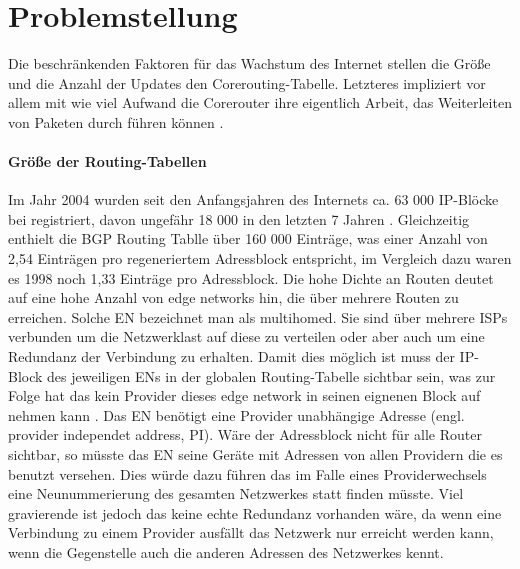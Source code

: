 \section{Problemstellung}
Die beschränkenden Faktoren für das Wachstum des Internet stellen die Größe und die Anzahl der Updates den Corerouting-Tabelle. Letzteres impliziert vor allem mit wie viel Aufwand die Corerouter ihre eigentlich Arbeit, das Weiterleiten von Paketen durch führen können \cite{Huston:2003:BGP}.

\paragraph{Größe der Routing-Tabellen}
Im Jahr 2004 wurden seit den Anfangsjahren des Internets ca. 63 000 IP-Blöcke bei registriert, davon ungefähr 18 000 in den letzten 7 Jahren \cite{journals/ccr/MengXZHLZ04}. Gleichzeitig enthielt die BGP Routing Tablle über 160 000 Einträge, was einer Anzahl von 2,54 Einträgen pro regeneriertem Adressblock entspricht, im Vergleich dazu waren es 1998 noch 1,33 Einträge pro Adressblock. Die hohe Dichte an Routen deutet auf eine hohe Anzahl von edge networks hin, die über mehrere Routen zu erreichen. Solche EN bezeichnet man als multihomed. Sie sind über mehrere ISPs verbunden um die Netzwerklast auf diese zu verteilen oder aber auch um eine Redundanz der Verbindung zu erhalten. Damit dies möglich ist muss der IP-Block des jeweiligen ENs in der globalen Routing-Tabelle sichtbar sein, was zur Folge hat das kein Provider dieses edge network in seinen eignenen Block auf nehmen kann \cite{jen:2008:start}. Das EN benötigt eine Provider unabhängige Adresse (engl. provider independet address, PI). Wäre der Adressblock nicht für alle Router sichtbar, so müsste das EN seine Geräte mit Adressen von allen Providern die es benutzt versehen. Dies würde dazu führen das im Falle eines Providerwechsels eine Neunummerierung des gesamten Netzwerkes statt finden müsste. Viel gravierende ist jedoch das keine echte Redundanz vorhanden wäre, da wenn eine Verbindung zu einem Provider ausfällt das Netzwerk nur erreicht werden kann, wenn die Gegenstelle auch die anderen Adressen des Netzwerkes kennt.


